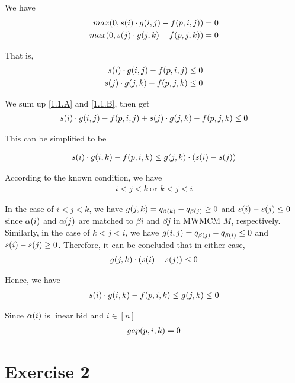 \documentclass[11pt,a4paper]{article}
\begin{document}
We have 
\begin{align}
    max(0, s(i) \cdot g(i,j) - f(p,i,j)) = 0 \\
    max(0, s(j) \cdot g(j,k) - f(p,j,k)) = 0
\end{align}

That is, 
\begin{align}
    s(i) \cdot g(i,j) - f(p,i,j) \leq 0 \label{1.1.A} \\
    s(j) \cdot g(j,k) - f(p,j,k) \leq 0 \label{1.1.B}
\end{align}

We sum up \eqref{1.1.A} and \eqref{1.1.B}, then get
\begin{align}
    s(i) \cdot g(i,j) - f(p,i,j) + s(j) \cdot g(j,k) - f(p,j,k) \leq 0 
\end{align}

This can be simplified to be 

\begin{align}
    s(i) \cdot g(i,k) - f(p,i,k) \leq  g(j,k) \cdot (s(i) - s(j))  
\end{align}

According to the known condition, we have
\begin{align}
    i < j < k \ \text{or }  k < j < i 
\end{align}

In the case of $i < j < k$, we have $g(j,k) = q_{\beta(k)} - q_{\beta(j)} \geq 0$ and 
$s(i) - s(j) \leq 0$ since $\alpha(i)$ and $\alpha(j)$ are matched to $\beta{i}$ and
$\beta{j}$ in MWMCM $M$, respectively. Similarly, in the case of $k < j < i$,
we have $g(i,j) = q_{\beta(j)} - q_{\beta(i)} \leq 0$ and $s(i) - s(j) \geq 0$.
Therefore, it can be concluded that in either case, 
\begin{align}
    g(j,k) \cdot (s(i) - s(j)) \leq 0
\end{align}

Hence, we have 
\begin{align}
    s(i) \cdot g(i,k) - f(p,i,k) \leq  g(j,k) \leq 0
\end{align}

Since $\alpha(i)$ is linear bid and $i \in [n]$
\begin{align}
    gap(p,i,k) = 0
\end{align}
\newpage

\section{Exercise 2}
\newcommand{\Lpn}{\ensuremath{L(p,n)}}
\newcommand{\Rpz}{\ensuremath{R(p,0)}}
 \\[0.5cm]
\end{document}
